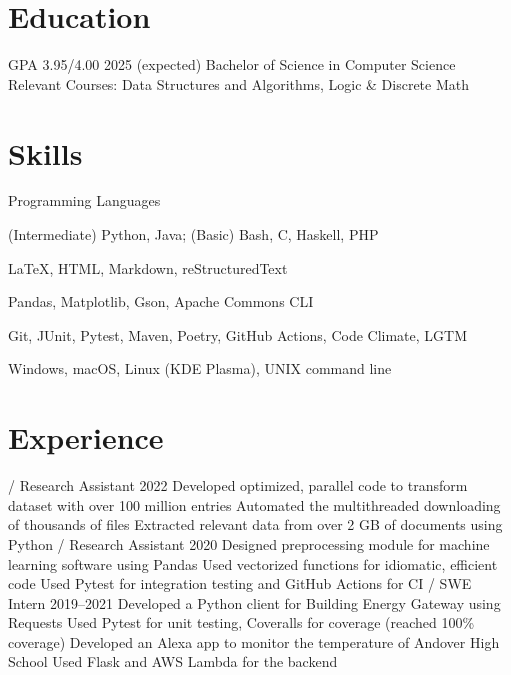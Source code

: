 \section{Education}
\begin{doutline}
     GPA 3.95/4.00 \hfill 2025 (expected)
        \2 Bachelor of Science in Computer Science
        \2 Relevant Courses: Data Structures and Algorithms, Logic \& Discrete Math
\end{doutline}

\section{Skills}
\begin{labeling}{Programming Languages}
    \item [Programming Languages] (Intermediate) Python, Java; (Basic) Bash, C, Haskell, PHP
    \item [Markup Languages] \LaTeX, HTML, Markdown, reStructuredText
    \item [Libraries] Pandas, Matplotlib, Gson, Apache Commons CLI
    \item [Tools] Git, JUnit, Pytest, Maven, Poetry, GitHub Actions, Code Climate, LGTM
    \item [Operating Systems] Windows, macOS, Linux (KDE Plasma), UNIX command line
\end{labeling}

\section{Experience}
\begin{doutline}
     / Research Assistant \hfill 2022
        \2 Developed optimized, parallel code to transform dataset with over 100 million entries
        \2 Automated the multithreaded downloading of thousands of files
        \2 Extracted relevant data from over 2 GB of documents using Python
     / Research Assistant \hfill 2020
        \2 Designed preprocessing module for machine learning software using Pandas
            \3 Used vectorized functions for idiomatic, efficient code
            \3 Used Pytest for integration testing and GitHub Actions for CI
     / SWE Intern \hfill 2019--2021
        \2 Developed a Python client for Building Energy Gateway using Requests
            \3 Used Pytest for unit testing, Coveralls for coverage (reached 100\% coverage)
        \2 Developed an Alexa app to monitor the temperature of Andover High School
            \3 Used Flask and AWS Lambda for the backend
\end{doutline}

